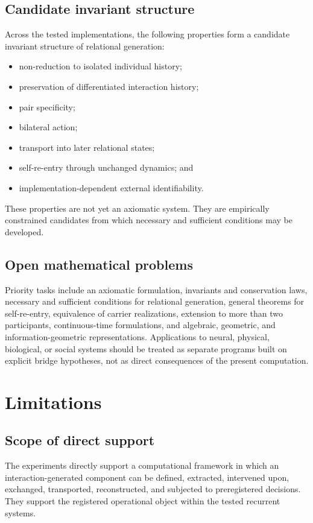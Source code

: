\documentclass[11pt,a4paper]{article}
\begin{document}
\subsection{Candidate invariant structure}

Across the tested implementations, the following properties form a candidate invariant structure of relational generation:
\begin{itemize}
  \item non-reduction to isolated individual history;
  \item preservation of differentiated interaction history;
  \item pair specificity;
  \item bilateral action;
  \item transport into later relational states;
  \item self-re-entry through unchanged dynamics; and
  \item implementation-dependent external identifiability.
\end{itemize}
These properties are not yet an axiomatic system. They are empirically constrained candidates from which necessary and sufficient conditions may be developed.

\subsection{Open mathematical problems}

Priority tasks include an axiomatic formulation, invariants and conservation laws, necessary and sufficient conditions for relational generation, general theorems for self-re-entry, equivalence of carrier realizations, extension to more than two participants, continuous-time formulations, and algebraic, geometric, and information-geometric representations. Applications to neural, physical, biological, or social systems should be treated as separate programs built on explicit bridge hypotheses, not as direct consequences of the present computation.

\section{Limitations}

\subsection{Scope of direct support}

The experiments directly support a computational framework in which an interaction-generated component can be defined, extracted, intervened upon, exchanged, transported, reconstructed, and subjected to preregistered decisions. They support the registered operational object within the tested recurrent systems.
\end{document}
